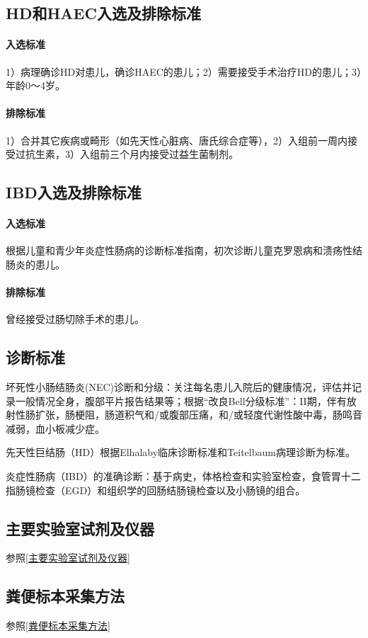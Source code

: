     \subsection{HD和HAEC入选及排除标准}
      \paragraph{入选标准} 1）病理确诊HD对患儿，确诊HAEC的患儿；2）需要接受手术治疗HD的患儿；3）年龄0～4岁。
      \paragraph{排除标准} 1）合并其它疾病或畸形（如先天性心脏病、唐氏综合症等），2）入组前一周内接受过抗生素，3）入组前三个月内接受过益生菌制剂。
    \subsection{IBD入选及排除标准}
      \paragraph{入选标准} 根据儿童和青少年炎症性肠病的诊断标准指南\cite{levine2014espghan}，初次诊断儿童克罗恩病和溃疡性结肠炎的患儿。
      \paragraph{排除标准} 曾经接受过肠切除手术的患儿。
  \subsection{诊断标准}
    坏死性小肠结肠炎(NEC)诊断和分级：关注每名患儿入院后的健康情况，评估并记录一般情况全身，腹部平片报告结果等；根据“改良Bell分级标准”\cite{bell1978neonatal}：II期，伴有放射性肠扩张，肠梗阻，肠道积气和/或腹部压痛，和/或轻度代谢性酸中毒，肠鸣音减弱，血小板减少症。

    先天性巨结肠（HD）根据Elhalaby临床诊断标准\cite{elhalaby1995enterocolitis}和Teitelbaum病理诊断为标准。

    炎症性肠病（IBD）的准确诊断：基于病史，体格检查和实验室检查，食管胃十二指肠镜检查（EGD）和组织学的回肠结肠镜检查以及小肠镜的组合。



  \subsection{主要实验室试剂及仪器}
  参照\ref{主要实验室试剂及仪器}
  \subsection{粪便标本采集方法}
  参照\ref{粪便标本采集方法}
